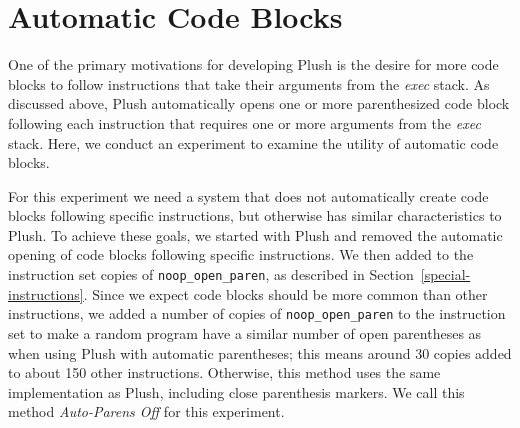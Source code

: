 





\section{Automatic Code Blocks}

One of the primary motivations for developing Plush is the desire for more code blocks to follow instructions that take their arguments from the \textit{exec} stack. As discussed above, Plush automatically opens one or more parenthesized code block following each instruction that requires one or more arguments from the \textit{exec} stack. Here, we conduct an experiment to examine the utility of automatic code blocks.

For this experiment we need a system that does not automatically create code blocks following specific instructions, but otherwise has similar characteristics to Plush. To achieve these goals, we started with Plush and removed the automatic opening of code blocks following specific instructions. We then added to the instruction set copies of \texttt{noop\_open\_paren}, as described in Section~\ref{special-instructions}. Since we expect code blocks should be more common than other instructions, we added a number of copies of \texttt{noop\_open\_paren} to the instruction set to make a random program have a similar number of open parentheses as when using Plush with automatic parentheses; this means around 30 copies added to about 150 other instructions. Otherwise, this method uses the same implementation as Plush, including close parenthesis markers. We call this method \textit{Auto-Parens Off} for this experiment.

